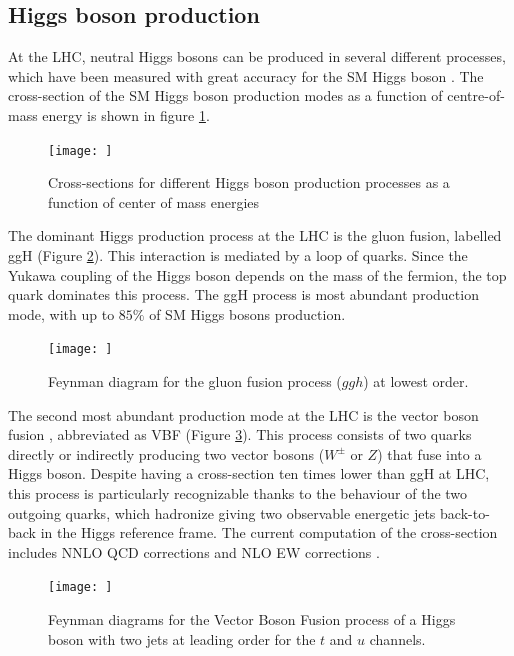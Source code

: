 \subsection{Higgs boson production}

At the LHC, neutral Higgs bosons can be produced in several different processes, which have been measured with great accuracy for the SM Higgs boson \cite{Dittmaier:1318996}. The cross-section of the SM Higgs boson production modes as a function of centre-of-mass energy is shown in figure \ref{fig:higgscrosssec}.

\begin{figure}
    \centering
    \texttt{[image: ]}
    \caption{Cross-sections for different Higgs boson production processes as a function of center of mass energies}
    \label{fig:higgscrosssec}
\end{figure}

The dominant Higgs production process at the LHC is the gluon fusion, labelled ggH (Figure \ref{fig:ggh}). This interaction is mediated by a loop of quarks. Since the Yukawa coupling of the Higgs boson depends on the mass of the fermion, the top quark dominates this process. The ggH process is most abundant production mode, with up to $85\%$ of SM Higgs bosons production.


\begin{figure}
    \centering
    \texttt{[image: ]}
    \caption{Feynman diagram for the gluon fusion process ($ggh$) at lowest order.}
    \label{fig:ggh}
\end{figure}


The second most abundant production mode at the LHC is the vector boson fusion \cite{PhysRevD.85.035002}, abbreviated as VBF (Figure \ref{fig:vbf}). This process consists of two quarks directly or indirectly producing two vector bosons ($W^{\pm}$ or $Z$) that fuse into a Higgs boson. Despite having a cross-section ten times lower than ggH at LHC, this process is particularly recognizable thanks to the behaviour of the two outgoing quarks, which hadronize giving two observable energetic jets back-to-back in the Higgs reference frame. The current computation of the cross-section includes NNLO QCD corrections and NLO EW corrections \cite{deFlorian:2227475}.

\begin{figure}
    \centering
    \texttt{[image: ]}
    \caption{Feynman diagrams for the Vector Boson Fusion process of a Higgs boson with two jets at leading order for the $t$ and $u$ channels.}
    \label{fig:vbf}
\end{figure}


